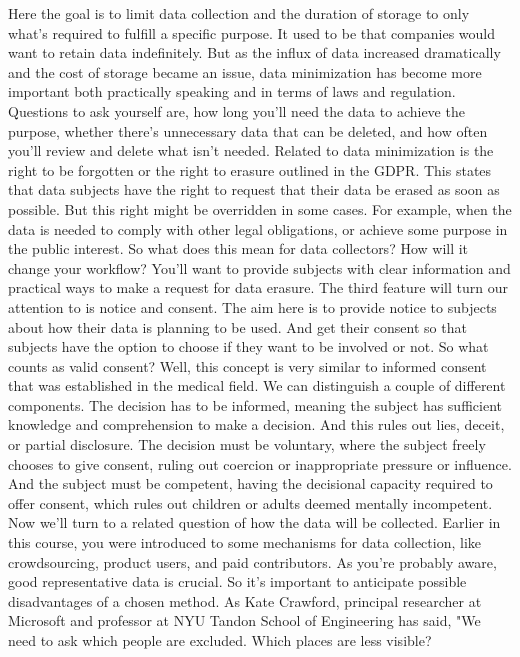 Here the goal is to limit data collection and the duration of storage
to only what's required to fulfill a specific purpose.
It used to be that companies would want to retain data indefinitely.
But as the influx of data increased dramatically and the cost of storage
became an issue, data minimization has become
more important both practically speaking and in terms of laws and regulation.
Questions to ask yourself are, how long you'll
need the data to achieve the purpose, whether there's
unnecessary data that can be deleted, and how often you'll review and delete
what isn't needed.
Related to data minimization is the right to be forgotten
or the right to erasure outlined in the GDPR.
This states that data subjects have the right
to request that their data be erased as soon as possible.
But this right might be overridden in some cases.
For example, when the data is needed to comply with other legal obligations,
or achieve some purpose in the public interest.
So what does this mean for data collectors?
How will it change your workflow?
You'll want to provide subjects with clear information and practical ways
to make a request for data erasure.
The third feature will turn our attention to is notice and consent.
The aim here is to provide notice to subjects about how
their data is planning to be used.
And get their consent so that subjects have the option
to choose if they want to be involved or not.
So what counts as valid consent?
Well, this concept is very similar to informed consent that
was established in the medical field.
We can distinguish a couple of different components.
The decision has to be informed, meaning the subject has sufficient knowledge
and comprehension to make a decision.
And this rules out lies, deceit, or partial disclosure.
The decision must be voluntary, where the subject freely
chooses to give consent, ruling out coercion or inappropriate pressure
or influence.
And the subject must be competent, having the decisional capacity required
to offer consent, which rules out children or adults deemed mentally
incompetent.
Now we'll turn to a related question of how the data will be collected.
Earlier in this course, you were introduced
to some mechanisms for data collection, like crowdsourcing, product users,
and paid contributors.
As you're probably aware, good representative data is crucial.
So it's important to anticipate possible disadvantages of a chosen method.
As Kate Crawford, principal researcher at Microsoft
and professor at NYU Tandon School of Engineering
has said, "We need to ask which people are excluded.
Which places are less visible?
